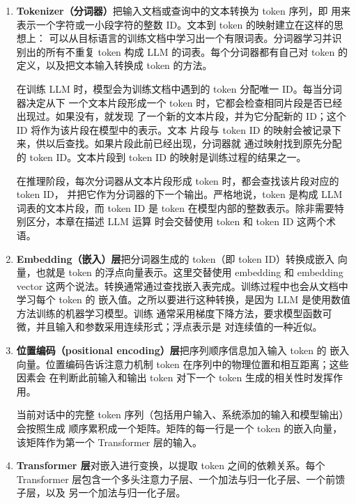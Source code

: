 \begin{enumerate}[label=\arabic*.,leftmargin=2.7em]
  \item \textbf{Tokenizer（分词器）}把输入文档或查询中的文本转换为 token 序列，即
  用来表示一个字符或一小段字符的整数 ID。文本到 token 的映射建立在这样的思想上：
  可以从目标语言的训练文档中学习出一个有限词表。分词器学习并识别出的所有不重复
  token 构成 LLM 的词表。每个分词器都有自己对 token 的定义，以及把文本输入转换成
  token 的方法。

  在训练 LLM 时，模型会为训练文档中遇到的 token 分配唯一 ID。每当分词器决定从下
  一个文本片段形成一个 token 时，它都会检查相同片段是否已经出现过。如果没有，就发现
  了一个新的文本片段，并为它分配新的 ID；这个 ID 将作为该片段在模型中的表示。文本
  片段与 token ID 的映射会被记录下来，供以后查找。如果片段此前已经出现，分词器就
  通过映射找到原先分配的 token ID。文本片段到 token ID 的映射是训练过程的结果之一。

  在推理阶段，每次分词器从文本片段形成 token 时，都会查找该片段对应的 token ID，
  并把它作为分词器的下一个输出。严格地说，token 是构成 LLM 词表的文本片段，而
  token ID 是 token 在模型内部的整数表示。除非需要特别区分，本章在描述 LLM 运算
  时会交替使用 token 和 token ID 这两个术语。

  \item \textbf{Embedding（嵌入）层}把分词器生成的 token（即 token ID）转换成嵌入
  向量，也就是 token 的浮点向量表示。这里交替使用 embedding 和 embedding vector
  这两个说法。转换通常通过查找嵌入表完成。训练过程中也会从文档中学习每个 token 的
  嵌入值。之所以要进行这种转换，是因为 LLM 是使用数值方法训练的机器学习模型。训练
  通常采用梯度下降方法，要求模型函数可微，并且输入和参数采用连续形式；浮点表示是
  对连续值的一种近似。

  \item \textbf{位置编码（positional encoding）层}把序列顺序信息加入输入 token 的
  嵌入向量。位置编码告诉注意力机制 token 在序列中的物理位置和相互距离；这些因素会
  在判断此前输入和输出 token 对下一个 token 生成的相关性时发挥作用。

  当前对话中的完整 token 序列（包括用户输入、系统添加的输入和模型输出）会按照生成
  顺序累积成一个矩阵。矩阵的每一行是一个 token 的嵌入向量，该矩阵作为第一个
  Transformer 层的输入。

  \item \textbf{Transformer 层}对嵌入进行变换，以提取 token 之间的依赖关系。每个
  Transformer 层包含一个多头注意力子层、一个加法与归一化子层、一个前馈子层，以及
  另一个加法与归一化子层。


\end{enumerate}
